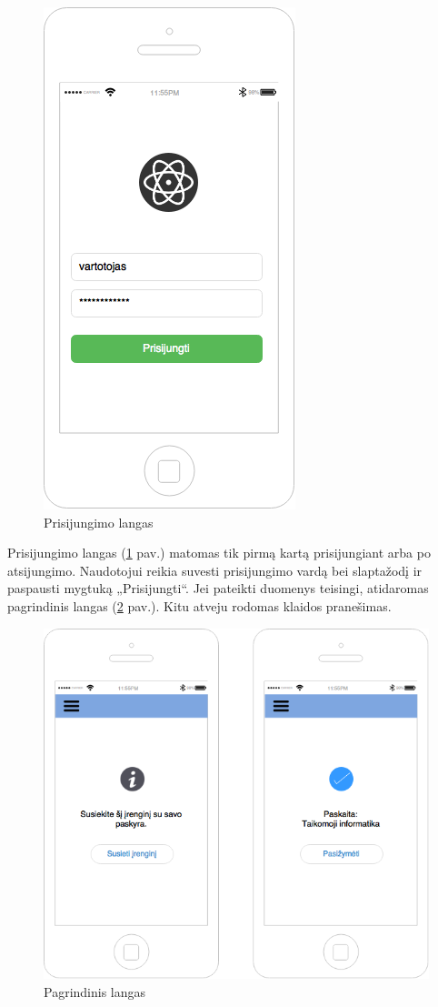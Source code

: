 \documentclass{VUMIFPSbakalaurinis}
\begin{document}
\begin{figure}[H]
	\centering
	\includegraphics[scale=0.5]{img/kursinio_app_login}
	\caption{Prisijungimo langas}
	\label{img:loginView}
\end{figure}

Prisijungimo langas (\ref{img:loginView} pav.) matomas tik pirmą kartą prisijungiant arba po atsijungimo. Naudotojui reikia suvesti prisijungimo vardą bei slaptažodį ir paspausti mygtuką „Prisijungti“. Jei pateikti duomenys teisingi, atidaromas pagrindinis langas (\ref{img:mainView} pav.). Kitu atveju rodomas klaidos pranešimas.

\begin{figure}[H]
	\centering
	\includegraphics[scale=0.5]{img/kursinio_app_main}
	\caption{Pagrindinis langas}
	\label{img:mainView}
\end{figure}
\end{document}
